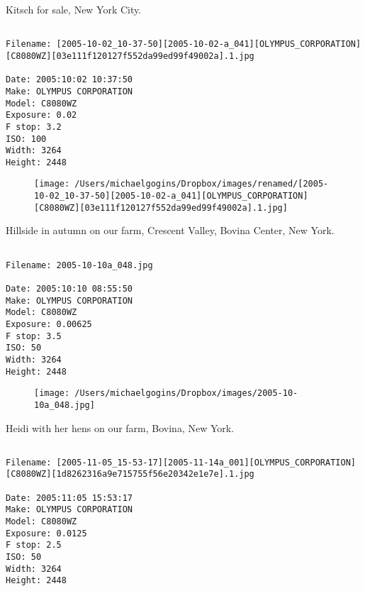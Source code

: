\documentclass[11pt,letter,DIV=14,paper=landscape]{scrbook}
\begin{document}
\clearpage
\noindent Kitsch for sale, New York City.
\noindent
\begin{lstlisting}

Filename: [2005-10-02_10-37-50][2005-10-02-a_041][OLYMPUS_CORPORATION][C8080WZ][03e111f120127f552da99ed99f49002a].1.jpg

Date: 2005:10:02 10:37:50
Make: OLYMPUS CORPORATION
Model: C8080WZ
Exposure: 0.02
F stop: 3.2
ISO: 100
Width: 3264
Height: 2448
\end{lstlisting}
\clearpage

\begin{figure}
\texttt{[image: /Users/michaelgogins/Dropbox/images/renamed/[2005-10-02\_10-37-50][2005-10-02-a\_041][OLYMPUS\_CORPORATION][C8080WZ][03e111f120127f552da99ed99f49002a].1.jpg]}
\end{figure}
    
\clearpage
\noindent Hillside in autumn on our farm, Crescent Valley, Bovina Center, New York.
\noindent
\begin{lstlisting}

Filename: 2005-10-10a_048.jpg

Date: 2005:10:10 08:55:50
Make: OLYMPUS CORPORATION
Model: C8080WZ
Exposure: 0.00625
F stop: 3.5
ISO: 50
Width: 3264
Height: 2448
\end{lstlisting}
\clearpage

\begin{figure}
\texttt{[image: /Users/michaelgogins/Dropbox/images/2005-10-10a\_048.jpg]}
\end{figure}
    
\clearpage
\noindent Heidi with her hens on our farm, Bovina, New York.
\noindent
\begin{lstlisting}

Filename: [2005-11-05_15-53-17][2005-11-14a_001][OLYMPUS_CORPORATION][C8080WZ][1d8262316a9e715755f56e20342e1e7e].1.jpg

Date: 2005:11:05 15:53:17
Make: OLYMPUS CORPORATION
Model: C8080WZ
Exposure: 0.0125
F stop: 2.5
ISO: 50
Width: 3264
Height: 2448
\end{lstlisting}
\clearpage
\end{document}
